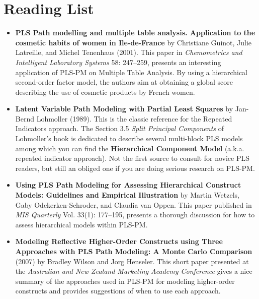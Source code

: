\documentclass[12pt]{book}\usepackage{graphicx, color}
\begin{document}
\section{Reading List}
\begin{itemize}
 \item \textbf{\textsf{PLS Path modelling and multiple table analysis. Application to the cosmetic habits of women in Ile-de-France}} by Christiane Guinot, Julie Latreille, and Michel Tenenhaus (2001). This paper in \textit{Chemometrics and Intelligent Laboratory Systems} 58: 247--259, presents an interesting application of PLS-PM on Multiple Table Analysis. By using a hierarchical second-order factor model, the authors aim at obtaining a global score describing the use of cosmetic products by French women.

 \vspace{2mm}
 \item \textbf{\textsf{Latent Variable Path Modeling with Partial Least Squares}} by Jan-Bernd Lohmoller (1989). This is the classic reference for the Repeated Indicators approach. The Section 3.5 \textit{Split Principal Components} of Lohmoller's book is dedicated to describe several multi-block PLS models among which you can find the \textbf{Hierarchical Component Model} (a.k.a. repeated indicator approach). Not the first source to consult for novice PLS readers, but still an obliged one if you are doing serious research on PLS-PM.
  
 \vspace{2mm}
 \item \textbf{\textsf{Using PLS Path Modeling for Assessing Hierarchical Construct Models: Guidelines and Empirical Illustration}} by Martin Wetzels, Gaby Odekerken-Schroder, and Claudia van Oppen. This paper published in \textit{MIS Quarterly} Vol. 33(1): 177--195, presents a thorough discussion for how to assess hierarchical models within PLS-PM.
 
 \vspace{2mm}
 \item \textbf{\textsf{Modeling Reflective Higher-Order Constructs using Three Approaches with PLS Path Modeling: A Monte Carlo Comparison}} (2007) by Bradley Wilson and Jorg Henseler. This short paper presented at the \textit{Australian and New Zealand Marketing Academy Conference} gives a nice summary of the approaches used in PLS-PM for modeling higher-order constructs and provides suggestions of when to use each approach.
 
\end{itemize}
\end{document}
